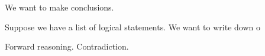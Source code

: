 

We want to make conclusions.


Suppose we have a list of logical statements.
We want to write down o

Forward reasoning.
Contradiction.

\blankpage
